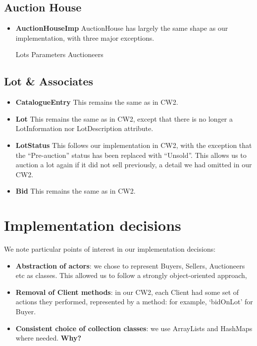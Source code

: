 \documentclass[titlepage, 12pt]{extarticle}
\begin{document}
\subsection{Auction House}
\begin{itemize}
    \item {\bf AuctionHouseImp} AuctionHouse has largely the same shape as our
        implementation, with three major exceptions.
        \begin{enumerate}
            Lots
            Parameters
            Auctioneers
        \end{enumerate}
\end{itemize}
\subsection{Lot & Associates}
\begin{itemize}
    \item {\bf CatalogueEntry} This remains the same as in CW2.
    \item {\bf Lot} This remains the same as in CW2, except that there is no
        longer a LotInformation nor LotDescription attribute. 
    \item {\bf LotStatus} This follows our implementation in CW2, with the
        exception that the ``Pre-auction'' status has been replaced with
        ``Unsold''. This allows us to auction a lot again if it did not sell
        previously, a detail we had omitted in our CW2. 
    \item {\bf Bid} This remains the same as in CW2.
\end{itemize}

\section{Implementation decisions}
We note particular points of interest in our implementation decisions:
\begin{itemize}
    \item {\bf Abstraction of actors}: we chose to represent Buyers, Sellers,
        Auctioneers etc as classes. This allowed us to follow a strongly
        object-oriented approach, 
    \item {\bf Removal of Client methods}: in our CW2, each Client had some set
        of actions they performed, represented by a method: for example,
        `bidOnLot' for Buyer. 
    \item {\bf Consistent choice of collection classes}: we use ArrayLists and
        HashMaps where needed. {\bf Why?}
\end{itemize}


\end{document}
